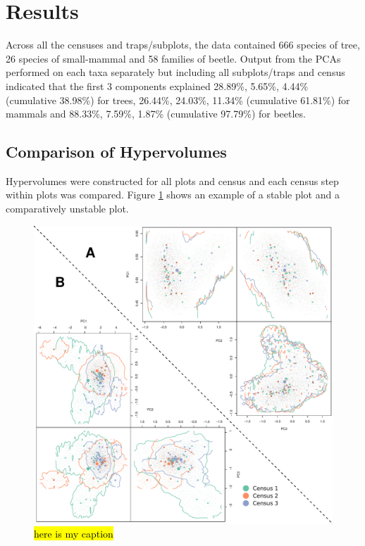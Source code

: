 \section{Results}

Across all the censuses and traps/subplots, the data contained 666 species of tree, 26 species of small-mammal and 58 families of beetle. Output from the PCAs performed on each taxa separately but including all subplots/traps and census indicated that the first 3 components explained 28.89\%, 5.65\%, 4.44\% (cumulative 38.98\%) for trees, 26.44\%, 24.03\%, 11.34\% (cumulative 61.81\%) for mammals and 88.33\%, 7.59\%, 1.87\% (cumulative 97.79\%) for beetles.


\subsection{Comparison of Hypervolumes}

Hypervolumes were constructed for all plots and census and each census step within plots was compared. Figure \ref{fig:1} shows an example of a stable plot and a comparatively unstable plot. 

\begin{figure}[H]
	\centering
	\includegraphics[width=\textwidth]{figures/figure1.pdf}
	\caption{\hl{here is my caption}}
	\label{fig:1}
\end{figure}	


